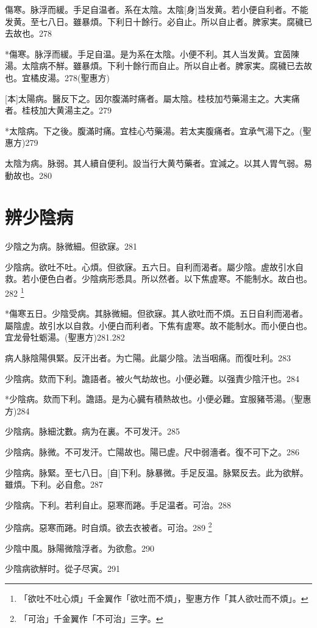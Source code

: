 \documentclass[12pt,twoside,UTF8,b5paper]{ctexbook}
\begin{document}
傷寒。脉浮而緩。手足自温者。系在太陰。太陰[身]当发黄。若小便自利者。不能发黄。至七八日。雖暴煩。下利日十餘行。必自止。所以自止者。脾家実。腐穢已去故也。278

*傷寒。脉浮而緩。手足自温。是为系在太陰。小便不利。其人当发黄。宜茵陳湯。太陰病不觧。雖暴煩。下利十餘行而自止。所以自止者。脾家実。腐穢已去故也。宜橘皮湯。278(聖惠方)

[本]太陽病。醫反下之。因尔腹滿时痛者。屬太陰。桂枝加芍藥湯主之。大実痛者。桂枝加大黄湯主之。279

*太陰病。下之後。腹滿时痛。宜桂心芍藥湯。若太実腹痛者。宜承气湯下之。(聖惠方)279

太陰为病。脉弱。其人續自便利。設当行大黄芍藥者。宜減之。以其人胃气弱。易動故也。280

\chapter{辨少陰病}

少陰之为病。脉微細。但欲寐。281

少陰病。欲吐不吐。心煩。但欲寐。五六日。自利而渴者。屬少陰。虗故引水自救。若小便色白者。少陰病形悉具。所以然者。以下焦虗寒。不能制水。故白也。282
	\footnote{「欲吐不吐心煩」千金翼作「欲吐而不煩」，聖惠方作「其人欲吐而不煩」。}

*傷寒五日。少陰受病。其脉微細。但欲寐。其人欲吐而不煩。五日自利而渴者。屬陰虗。故引水以自救。小便白而利者。下焦有虗寒。故不能制水。而小便白也。宜龙骨牡蛎湯。(聖惠方)281.282

病人脉陰陽俱緊。反汗出者。为亡陽。此屬少陰。法当咽痛。而復吐利。283

少陰病。欬而下利。譫語者。被火气劫故也。小便必難。以强責少陰汗也。284

*少陰病。欬而下利。譫語。是为心臓有積熱故也。小便必難。宜服豬苓湯。(聖惠方)284

少陰病。脉細沈數。病为在裏。不可发汗。285

少陰病。脉微。不可发汗。亡陽故也。陽已虗。尺中弱濇者。復不可下之。286

少陰病。脉緊。至七八日。[自]下利。脉暴微。手足反温。脉緊反去。此为欲觧。雖煩。下利。必自愈。287

少陰病。下利。若利自止。惡寒而踡。手足温者。可治。288

少陰病。惡寒而踡。时自煩。欲去衣被者。可治。289
	\footnote{「可治」千金翼作「不可治」三字。}

少陰中風。脉陽微陰浮者。为欲愈。290

少陰病欲觧时。從子尽寅。291
\end{document}
